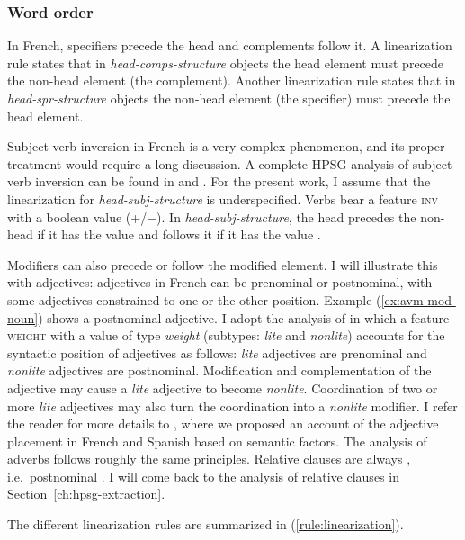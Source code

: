 \subsubsection{Word order}

In French, specifiers precede the head and complements follow it. A linearization rule states that in \emph{head-comps-structure} objects the head element must precede the non-head element (the complement). Another linearization rule states that in \emph{head-spr-structure} objects the non-head element (the specifier) must precede the head element.

Subject-verb inversion in French is a very complex phenomenon, and its proper treatment would require a long discussion. A complete HPSG analysis of subject-verb inversion can be found in \citet{Bonami.1998} and \citet{Bonami.2001}. For the present work, I assume that the linearization for \emph{head-subj-structure} is underspecified. Verbs bear a feature \textsc{inv} with a boolean value (+/$-$). In \emph{head-subj-structure}, the head precedes the non-head if it has the value  and follows it if it has the value . 

Modifiers can also precede or follow the modified element. I will illustrate this with adjectives: adjectives in French can be prenominal or postnominal, with some adjectives constrained to one or the other position. Example (\ref{ex:avm-mod-noun}) shows a postnominal adjective. I adopt the analysis of \citet{Abeille.1999.Weight,Abeille.1999.Adjectif} in which a feature \textsc{weight} with a value of type \emph{weight} (subtypes: \emph{lite} and \emph{nonlite}) accounts for the syntactic position of adjectives as follows: \emph{lite} adjectives are prenominal and \emph{nonlite} adjectives are postnominal. Modification and complementation of the adjective may cause a \emph{lite} adjective to become \emph{nonlite}. Coordination of two or more \emph{lite} adjectives may also turn the coordination into a \emph{nonlite} modifier. I refer the reader for more details to \citet{MyP.2015}, where we proposed an account of the adjective placement in French and Spanish based on semantic factors. The analysis of adverbs follows roughly the same principles. 
Relative clauses are always , i.e.\ postnominal  \citep[343]{Abeille.1999.Weight}. I will come back to the analysis of relative clauses in Section~\ref{ch:hpsg-extraction}.

The different linearization rules are summarized in (\ref{rule:linearization}).

